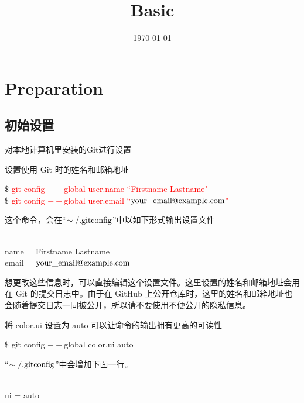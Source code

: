 \documentclass[12pt,a4paper]{article}
\title{Basic}
\author{}
\date{\today}
\begin{document}
\maketitle

\section{Preparation}

\subsection{初始设置}
对本地计算机里安装的Git进行设置

设置使用 Git 时的姓名和邮箱地址
\begin{tcolorbox}[colback=green!5,colframe=green!40!black,title= ]
$\$$ \textcolor{red}{git config $--$global user.name ``Firstname Lastname"} \\
$\$$ \textcolor{red}{git config $--$global user.email ``$\rm your\_email@example.com$"}
\end{tcolorbox}
这个命令，会在``$\rm \sim/.gitconfig$”中以如下形式输出设置文件
\begin{tcolorbox}[colback=green!5,colframe=green!40!black,title= ]
[user] \\
name = Firstname Lastname \\
email = $\rm your\_email@example.com$
\end{tcolorbox}
想更改这些信息时，可以直接编辑这个设置文件。这里设置的姓名和邮箱地址会用在 Git 的提交日志中。由于在 GitHub 上公开仓库时，这里的姓名和邮箱地址也会随着提交日志一同被公开，所以请不要使用不便公开的隐私信息。

将 color.ui 设置为 auto 可以让命令的输出拥有更高的可读性
\begin{tcolorbox}[colback=green!5,colframe=green!40!black,title= ]
$\$$ git config $--$global color.ui auto 
\end{tcolorbox}
``$\rm \sim/.gitconfig$”中会增加下面一行。
\begin{tcolorbox}[colback=green!5,colframe=green!40!black,title= ]
[color] \\
ui = auto
\end{tcolorbox}
\end{document}
